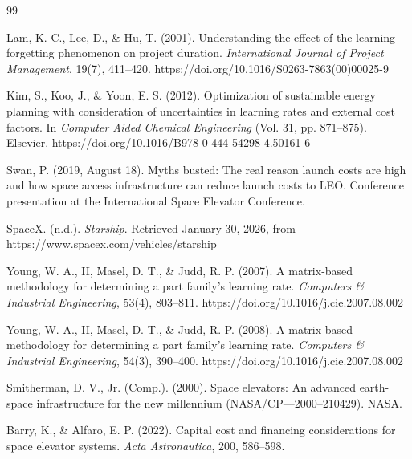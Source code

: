 \documentclass[12pt]{mcmthesis}
\begin{document}
{
\small
\setlength{\itemsep}{0pt}
\setlength{\parskip}{0pt}
\setlength{\parsep}{0pt}
\begin{thebibliography}{99}

    Lam, K. C., Lee, D., \& Hu, T. (2001).
    Understanding the effect of the learning--forgetting phenomenon on project duration.
    \textit{International Journal of Project Management}, 19(7), 411--420.
    https://doi.org/10.1016/S0263-7863(00)00025-9

    Kim, S., Koo, J., \& Yoon, E. S. (2012).
    Optimization of sustainable energy planning with consideration of uncertainties in learning rates and external cost factors.
    In \textit{Computer Aided Chemical Engineering} (Vol. 31, pp. 871--875).
    Elsevier.
    https://doi.org/10.1016/B978-0-444-54298-4.50161-6

    Swan, P. (2019, August 18).
    Myths busted: The real reason launch costs are high and how space access infrastructure can reduce launch costs to LEO.
    Conference presentation at the International Space Elevator Conference.

    SpaceX. (n.d.).
    \textit{Starship}.
    Retrieved January 30, 2026, from https://www.spacex.com/vehicles/starship

    Young, W. A., II, Masel, D. T., \& Judd, R. P. (2007).
    A matrix-based methodology for determining a part family's learning rate.
    \textit{Computers \& Industrial Engineering}, 53(4), 803--811.
    https://doi.org/10.1016/j.cie.2007.08.002

    Young, W. A., II, Masel, D. T., \& Judd, R. P. (2008).
    A matrix-based methodology for determining a part family's learning rate.
    \textit{Computers \& Industrial Engineering}, 54(3), 390--400.
    https://doi.org/10.1016/j.cie.2007.08.002

    Smitherman, D. V., Jr. (Comp.). (2000). Space elevators: An advanced earth-space infrastructure for the new millennium (NASA/CP---2000--210429). NASA.

    Barry, K., \& Alfaro, E. P. (2022).
    Capital cost and financing considerations for space elevator systems.
    \textit{Acta Astronautica}, 200, 586--598.


\end{thebibliography}
}

\newpage
\end{document}
